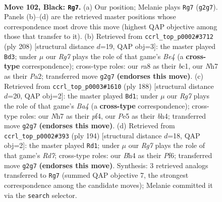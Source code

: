 \documentclass[11pt]{article}
\begin{document}
\clearpage

\begin{figure}[p]\centering
\begin{subfigure}{0.46\textwidth}\centering
\resizebox{\linewidth}{!}{%
\newchessgame
\chessboard[
  setfen={R7/7n/7p/4p2k/7b/1K1p4/6r1/8 b - - 1 102},
  showmover=false,
  pgfstyle=straightmove, color=movearrow, markmove={g2-g7}
]}
\caption{}
\end{subfigure}\hfill
\begin{subfigure}{0.46\textwidth}\centering
\resizebox{\linewidth}{!}{%
\newchessgame
\chessboard[
  setfen={8/k7/8/1K6/1P2B3/8/P7/2b5 w - - 53 105},
  showmover=false,
  pgfstyle=straightmove, color=movearrow, markmove={e4-d3}
]}
\caption{}
\end{subfigure}
\\[4pt]
\begin{subfigure}{0.46\textwidth}\centering
\resizebox{\linewidth}{!}{%
\newchessgame
\chessboard[
  setfen={8/8/1k1p4/3P4/B1K2p1b/2P5/1P6/8 w - - 5 95},
  showmover=false,
  pgfstyle=straightmove, color=movearrow, markmove={a4-d1}
]}
\caption{}
\end{subfigure}\hfill
\begin{subfigure}{0.46\textwidth}\centering
\resizebox{\linewidth}{!}{%
\newchessgame
\chessboard[
  setfen={5k2/3R4/5P2/5K2/5P2/r7/8/8 w - - 37 98},
  showmover=false,
  pgfstyle=straightmove, color=movearrow, markmove={d7-d1}
]}
\caption{}
\end{subfigure}
\caption{\textbf{Move 102, Black: \texttt{Rg7}.} (a) Our position; Melanie plays \texttt{Rg7} (\texttt{g2g7}). Panels (b)--(d) are the retrieved master positions whose correspondence most drove this move (highest QAP objective among those that transfer to it). (b) Retrieved from \texttt{ccrl\_top\_p0002\#3712} (ply 208) [structural distance $d$=19, QAP obj=3]: the master played \texttt{Bd3}; under $\mu$ our \emph{Rg7} plays the role of that game's \emph{Be4} (a \textbf{cross-type} correspondence); cross-type roles: our \emph{r}a8 as their \emph{b}c1, our \emph{N}h7 as their \emph{P}a2; transferred move \texttt{g2g7} \textbf{(endorses this move)}. (c) Retrieved from \texttt{ccrl\_top\_p0003\#1610} (ply 188) [structural distance $d$=20, QAP obj=2]: the master played \texttt{Bd1}; under $\mu$ our \emph{Rg7} plays the role of that game's \emph{Ba4} (a \textbf{cross-type} correspondence); cross-type roles: our \emph{N}h7 as their \emph{p}f4, our \emph{P}e5 as their \emph{b}h4; transferred move \texttt{g2g7} \textbf{(endorses this move)}. (d) Retrieved from \texttt{ccrl\_top\_p0002\#393} (ply 194) [structural distance $d$=18, QAP obj=2]: the master played \texttt{Rd1}; under $\mu$ our \emph{Rg7} plays the role of that game's \emph{Rd7}; cross-type roles: our \emph{B}h4 as their \emph{P}f6; transferred move \texttt{g2g7} \textbf{(endorses this move)}. Synthesis: 3 retrieved analogs transferred to \texttt{Rg7} (summed QAP objective 7, the strongest correspondence among the candidate moves); Melanie committed it via the \texttt{search} selector.}
\label{fig:thought-m203}
\end{figure}
\end{document}
